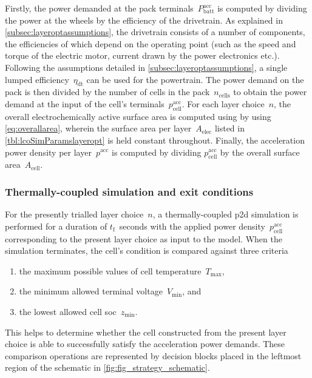 Firstly, the power demanded  at the pack terminals~$P^\text{acc}_\text{batt}$ is
computed  by  dividing  the  power  at  the wheels  by  the  efficiency  of  the
drivetrain.  As explained  in \cref{subsec:layeroptassumptions},  the drivetrain
consists of  a number  of components,  the efficiencies of  which depend  on the
operating point  (such as the  speed and torque  of the electric  motor, current
drawn  by the  power electronics  etc.). Following  the assumptions  detailed in
\cref{subsec:layeroptassumptions},  a single  lumped efficiency~$\eta_\text{dt}$
can be  used for the powertrain.  The power demand  on the pack is  then divided
by  the  number of  cells  in  the pack~$n_\text{cells}$  to  obtain the  power
demand  at the  input  of the  cell's terminals~$p^\text{acc}_\text{cell}$.  For
each  layer choice~$n$,  the overall  electrochemically active  surface area  is
computed  using by  using \cref{eq:overallarea},  wherein the  surface area  per
layer~$A_\text{elec}$ listed in \cref{tbl:lcoSimParamslayeropt} is held constant
throughout.  Finally, the  acceleration power  density per  layer~$p^\text{acc}$
is  computed  by  dividing  $p^\text{acc}_\text{cell}$ by  the  overall  surface
area~$A_\text{cell}$.

\subsubsection*{Thermally-coupled  simulation and exit
conditions}\label{sec:accexitconditions}

For  the  presently trialled  layer  choice~$n$,  a thermally-coupled  \gls{p2d}
simulation is performed for a duration  of $t_\text{f}$~seconds with the applied
power  density~$p^\text{acc}_\text{cell}$  corresponding  to  the present  layer
choice  as input  to  the  model. When  the  simulation  terminates, the  cell's
condition is compared against three criteria
\begin{enumerate}
    \item the maximum possible values of cell temperature~$T_\text{max}$,
    \item the minimum allowed terminal voltage~$V_\text{min}$, and
    \item the lowest allowed cell \gls{soc}~$z_\text{min}$.
\end{enumerate}
This helps  to determine  whether the  cell constructed  from the  present layer
choice is  able to  successfully satisfy the  acceleration power  demands. These
comparison operations are represented by  decision blocks placed in the leftmost
region of the schematic in \cref{fig:fig_strategy_schematic}.


